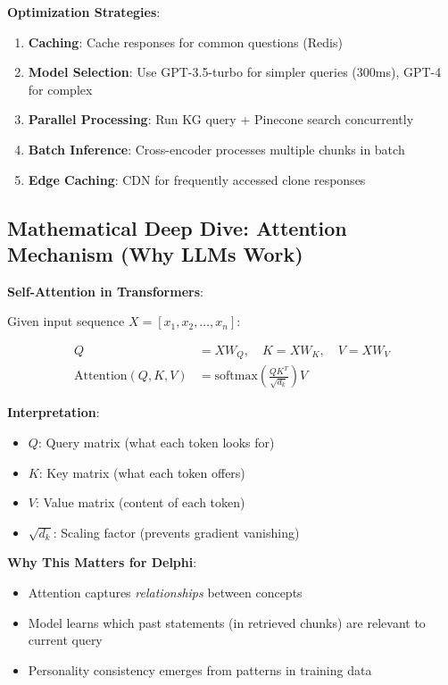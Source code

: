 \documentclass[10pt]{article}
\begin{document}
\textbf{Optimization Strategies}:
\begin{enumerate}[leftmargin=*]
    \item \textbf{Caching}: Cache responses for common questions (Redis)
    \item \textbf{Model Selection}: Use GPT-3.5-turbo for simpler queries (300ms), GPT-4 for complex
    \item \textbf{Parallel Processing}: Run KG query + Pinecone search concurrently
    \item \textbf{Batch Inference}: Cross-encoder processes multiple chunks in batch
    \item \textbf{Edge Caching}: CDN for frequently accessed clone responses
\end{enumerate}

\subsection{Mathematical Deep Dive: Attention Mechanism (Why LLMs Work)}

\textbf{Self-Attention in Transformers}:

Given input sequence $X = [x_1, x_2, \ldots, x_n]$:

\begin{align*}
Q &= XW_Q, \quad K = XW_K, \quad V = XW_V \\
\text{Attention}(Q, K, V) &= \text{softmax}\left(\frac{QK^T}{\sqrt{d_k}}\right) V
\end{align*}

\textbf{Interpretation}:
\begin{itemize}[leftmargin=*]
    \item $Q$: Query matrix (what each token looks for)
    \item $K$: Key matrix (what each token offers)
    \item $V$: Value matrix (content of each token)
    \item $\sqrt{d_k}$: Scaling factor (prevents gradient vanishing)
\end{itemize}

\textbf{Why This Matters for Delphi}:
\begin{itemize}[leftmargin=*]
    \item Attention captures \textit{relationships} between concepts
    \item Model learns which past statements (in retrieved chunks) are relevant to current query
    \item Personality consistency emerges from patterns in training data
\end{itemize}
\end{document}
